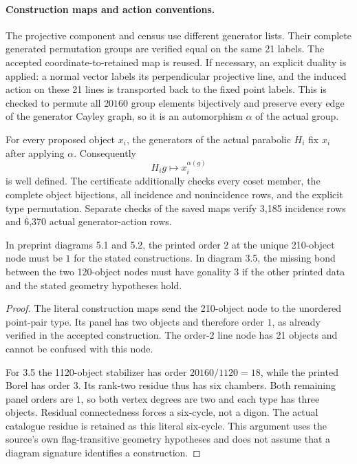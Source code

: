 \documentclass[10pt]{article}
\begin{document}
\paragraph{Construction maps and action conventions.}
The projective component and census use different generator lists.  Their
complete generated permutation groups are verified equal on the same 21
labels.  The accepted coordinate-to-retained map is reused.  If necessary,
an explicit duality is applied: a normal vector labels its perpendicular
projective line, and the induced action on these 21 lines is transported back
to the fixed point labels.  This is checked to permute all $20160$ group
elements bijectively and preserve every edge of the generator Cayley graph,
so it is an automorphism $\alpha$ of the actual group.

For every proposed object $x_i$, the generators of the actual parabolic $H_i$
fix $x_i$ after applying $\alpha$.  Consequently
\[
                  H_i g\longmapsto x_i^{\alpha(g)}
\]
is well defined.  The certificate additionally checks every coset member,
the complete object bijections, all incidence and nonincidence rows, and the
explicit type permutation.  Separate checks of the saved maps verify
3,185 incidence rows and 6,370 actual generator-action rows.

\begin{lemma}\label{errors}
In preprint diagrams 5.1 and 5.2, the printed order $2$ at the unique
210-object node must be $1$ for the stated constructions.  In diagram 3.5,
the missing bond between the two 120-object nodes must have gonality $3$
if the other printed data and the stated geometry hypotheses hold.
\end{lemma}
\begin{proof}
The literal construction maps send the 210-object node to the unordered
point-pair type.  Its panel has two objects and therefore order $1$, as already
verified in the accepted construction.  The order-$2$ line node has 21 objects
and cannot be confused with this node.

For 3.5 the 1120-object stabilizer has order $20160/1120=18$, while the printed
Borel has order $3$.  Its rank-two residue thus has six chambers.  Both
remaining panel orders are $1$, so both vertex degrees are two and each type
has three objects.  Residual connectedness forces a six-cycle, not a digon.
The actual catalogue residue is retained as this literal six-cycle.  This
argument uses the source's own flag-transitive geometry hypotheses and does
not assume that a diagram signature identifies a construction.
\end{proof}
\end{document}
